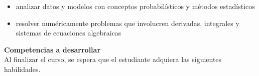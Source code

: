 \documentclass[letterpaper,10pt,onecolumn]{article}
\begin{document}
\begin{itemize}
\item analizar datos y modelos con conceptos probabil\'isticos y
  m\'etodos estad\'isticos \\[-0.6cm] 
\item resolver num\'ericamente problemas que involucren derivadas,
  integrales y sistemas de ecuaciones algebraicas \\[-0.6cm]
\end{itemize} 
\vspace*{0.5cm} 

\noindent\textbf{\large {} \quad Competencias a
  desarrollar}\\[-0.2cm] 


\noindent\normalsize Al finalizar el curso, se espera que el
estudiante adquiera las siguientes habilidades. 
\end{document}
